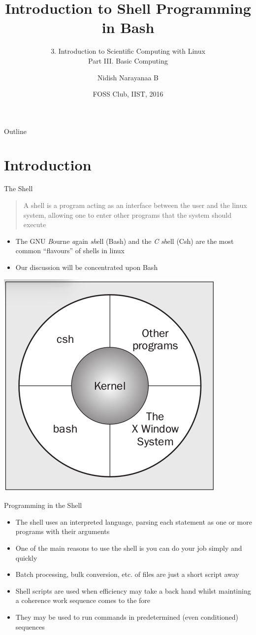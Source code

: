 \documentclass{beamer}
\title[Bash]{Introduction to Shell Programming in Bash}
\subtitle{3. Introduction to Scientific Computing with Linux\\Part
  III. Basic Computing}
\author[Nidish, B. N.]{Nidish Narayanaa B\inst{1}}
\institute[IIST]{
  \inst{1}%
  Department of Aerospace Engineering\\
  Indian Institute of Space Science \& Technology, Trivandrum
}
\date[IISTFOSS, 16]{FOSS Club, IIST, 2016}
\begin{document}
\begin{frame}
  \titlepage
\end{frame}

\begin{frame}{Outline}
  \tableofcontents
\end{frame}

\section{Introduction}
\begin{frame}[fragile]{The Shell}
  \begin{quotation}
    A shell is a program acting as an interface between the user and
    the linux system, allowing one to enter other programs that the
    system should execute
  \end{quotation}
  \begin{itemize}
    \item The GNU \emph{B}ourne \emph{a}gain \emph{sh}ell (Bash) and
      the \emph{C} \emph{sh}ell (Csh) are the most common ``flavours''
      of shells in linux
    \item Our discussion will be concentrated upon Bash
  \end{itemize}
  \begin{center}
    \includegraphics[width=.4\linewidth]{Figs/system.png}
  \end{center}
\end{frame}

\begin{frame}[fragile]{Programming in the Shell}
  \begin{itemize}
    \item The shell uses an interpreted language, parsing each
      statement as one or more programs with their arguments
    \item One of the main reasons to use the shell is you can do your
      job simply and quickly
    \item Batch processing, bulk conversion, etc. of files are just a
      short script away
    \item Shell scripts are used when efficiency may take a back hand
      whilst maintining a coherence work sequence comes to the fore
    \item They may be used to run commands in predetermined (even
      conditioned) sequences
  \end{itemize}
\end{frame}
\end{document}
